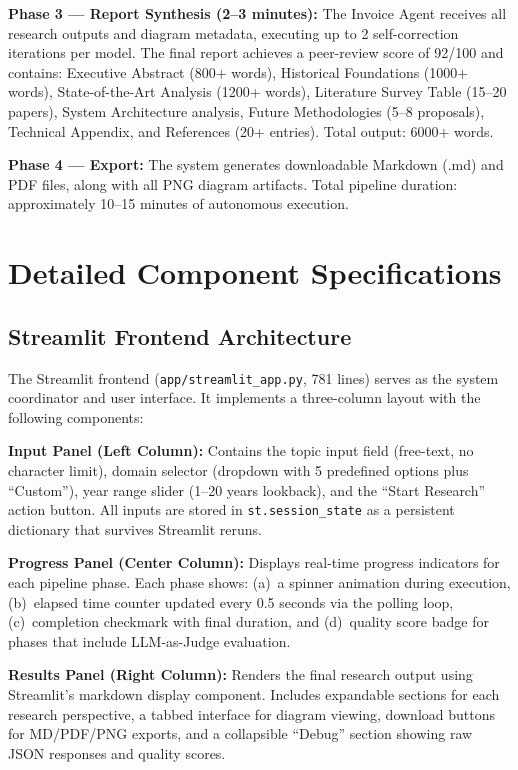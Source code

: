 \documentclass[a4paper,12pt,openany]{report}
\begin{document}
\textbf{Phase 3 --- Report Synthesis (2--3 minutes):} The Invoice Agent receives all research outputs and diagram metadata, executing up to 2 self-correction iterations per model. The final report achieves a peer-review score of 92/100 and contains: Executive Abstract (800+ words), Historical Foundations (1000+ words), State-of-the-Art Analysis (1200+ words), Literature Survey Table (15--20 papers), System Architecture analysis, Future Methodologies (5--8 proposals), Technical Appendix, and References (20+ entries). Total output: 6000+ words.

\textbf{Phase 4 --- Export:} The system generates downloadable Markdown (.md) and PDF files, along with all PNG diagram artifacts. Total pipeline duration: approximately 10--15 minutes of autonomous execution.

\section{Detailed Component Specifications}

\subsection{Streamlit Frontend Architecture}

The Streamlit frontend (\texttt{app/streamlit\_app.py}, 781 lines) serves as the system coordinator and user interface. It implements a three-column layout with the following components:

\textbf{Input Panel (Left Column):} Contains the topic input field (free-text, no character limit), domain selector (dropdown with 5 predefined options plus ``Custom''), year range slider (1--20 years lookback), and the ``Start Research'' action button. All inputs are stored in \texttt{st.session\_state} as a persistent dictionary that survives Streamlit reruns.

\textbf{Progress Panel (Center Column):} Displays real-time progress indicators for each pipeline phase. Each phase shows: (a)~a spinner animation during execution, (b)~elapsed time counter updated every 0.5 seconds via the polling loop, (c)~completion checkmark with final duration, and (d)~quality score badge for phases that include LLM-as-Judge evaluation.

\textbf{Results Panel (Right Column):} Renders the final research output using Streamlit's markdown display component. Includes expandable sections for each research perspective, a tabbed interface for diagram viewing, download buttons for MD/PDF/PNG exports, and a collapsible ``Debug'' section showing raw JSON responses and quality scores.
\end{document}
